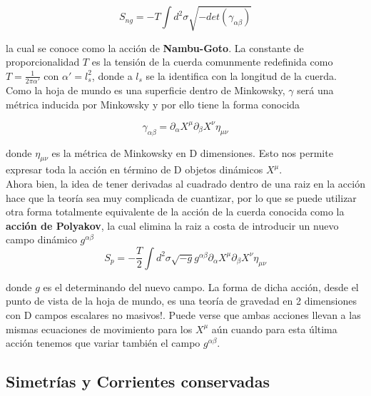 \documentclass[]{article}
\begin{document}
\begin{equation}
S_{ng}=-T\int d^{2}\sigma\sqrt{-det(\gamma_{\alpha\beta})}
\end{equation}


\noindent la cual se conoce como la acción de \textbf{Nambu-Goto}. La constante de proporcionalidad $T$ es la tensión de la
cuerda comunmente redefinida como $T=\frac{1}{2\pi\alpha'}$ con $\alpha'=l_{s}^{2}$,
donde a $l_{s}$ se la identifica con la longitud de la cuerda. Como la hoja de mundo es una superficie dentro de Minkowsky, $ \gamma $ será una métrica inducida por Minkowsky y por ello tiene la forma conocida

\begin{equation}\label{key}
\gamma_{\alpha\beta}=\partial_{\alpha}X^{\mu}\partial_{\beta}X^{\nu}\eta_{\mu\nu}
\end{equation}

\noindent donde $ \eta_{\mu\nu} $ es la métrica de Minkowsky en D dimensiones. Esto nos permite expresar toda la acción en término de D objetos dinámicos $ X^{\mu} $.\\

Ahora bien, la idea de tener derivadas al cuadrado dentro de una raiz en
la acción hace que la teoría sea muy complicada de cuantizar, por lo
que se puede utilizar otra forma totalmente equivalente de la acción
de la cuerda conocida como la \textbf{acción de Polyakov}, la cual
elimina la raiz a costa de introducir un nuevo campo dinámico $ g^{\alpha\beta} $
\begin{equation}
S_{p}=-\frac{T}{2}\int d^{2}\sigma\sqrt{-g}g^{\alpha\beta}\partial_{\alpha}X^{\mu}\partial_{\beta}X^{\nu}\eta_{\mu\nu}
\end{equation}

donde $g$ es el determinando del nuevo campo. La forma de dicha acción, desde el punto de vista de la hoja de mundo,
es una teoría de gravedad en 2 dimensiones con D campos escalares
no masivos!. Puede verse que ambas acciones llevan a las mismas ecuaciones de movimiento para los $X^{\mu}$ aún cuando para esta última acción tenemos que variar también el campo $ g^{\alpha\beta} $.

\subsection*{Simetrías y Corrientes conservadas}
\end{document}
